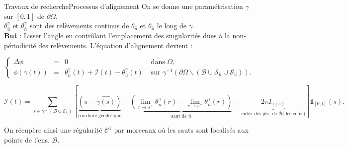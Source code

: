 \documentclass[compress,10pt,aspectratio=169]{beamer}
\begin{document}
\begin{frame}{Travaux de recherche}{Processus d'alignement}
\small
\vspace{-0.4cm}
On se donne une paramétrisation \(\gamma\) sur \([0, 1]\) de \(\partial\Omega\).\\\vspace{0.12cm}
\(\theta_{\bar{u}}^\gamma\) et \(\theta_{\bar{n}}^\gamma\) sont des relèvements continus de \(\theta_{\bar{u}}\) et \(\theta_{\bar{n}}\) le long de \(\gamma\).\\\vspace{0.12cm}
\textbf{But} : Lisser l'angle en contrôlant l'emplacement des singularités dues à la non-périodicité des relèvements. L'équation d'alignement devient :\\\vspace{0.12cm}

\begin{equation*}
\left\{
\begin{array}{lcll}
\Delta\phi &=& 0 &\mbox{ dans } \Omega,\\[0.4cm]
\phi(\gamma(t)) &=& \theta_{\bar{n}}^\gamma(t) + \mathcal{I}(t) - \theta_{\bar{u}}^\gamma(t) & \mbox{ sur } \gamma^{-1}(\partial\Omega \backslash (\mathcal{B} \cup \mathcal{S}_{\bar{n}} \cup \mathcal{S}_{\bar{u}})).
\end{array}
\right.
\end{equation*}

\begin{equation*}
\mathcal{I}(t) = \sum_{s \in \gamma^{-1}(\mathcal{B} \cup \mathcal{S}_{\bar{n}})} \left[\underbrace{\left(\pi - \widehat{\gamma(s)}\right)}_{\text{courbure géodésique}} - \underbrace{\left(\lim\limits_{r \rightarrow s^+}\theta^{\gamma}_{\bar{n}}(r) - \lim\limits_{r \rightarrow s^-}\theta^{\gamma}_{\bar{n}}(r)\right)}_{\text{saut de }\bar{n}} - \underbrace{2\pi I_{\gamma(s)}}_{\text{index des pts. de }\mathcal{B}\text{( les coins)}}\right] \mathbb{1}_{[0, t]}(s).
\end{equation*}

On récupère ainsi une régularité \(\mathcal{C}^1\) par morceaux où les sauts sont localisés aux points de l'ens. \(\mathcal{B}\).

\end{frame}
\end{document}
